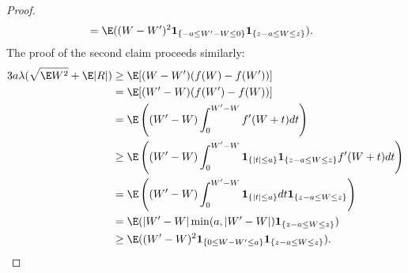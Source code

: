 \begin{proof}
\begin{align*}
    &= \E((W-W')^2 \mathbf{1}_{\{-a \leq W' - W \leq 0\}} \mathbf{1}_{\{z - a \leq W \leq z\}}).
  \end{align*}
  The proof of the second claim proceeds similarly:
    \begin{align*}
      3a \lambda (\sqrt{\E W^2} + \E |R|) &\geq \E [(W-W')(f(W)-f(W'))] \\
      &= \E [(W'-W)(f(W')-f(W))] \\
      &= \E \left ( (W'-W) \int_{0}^{W'-W} f'(W+t)dt \right ) \\ 
      &\geq \E \left( (W'-W) \int_{0}^{W'-W} \mathbf{1}_{\{|t| \leq a\}} 
      \mathbf{1}_{\{z - a \leq W \leq z\}} f'(W + t) dt \right ) \\
      &= \E \left( (W'-W) \int_{0}^{W'-W} \mathbf{1}_{\{|t| \leq a\}} dt
      \mathbf{1}_{\{z - a \leq W \leq z\}} \right ) \\
      &= \E(|W'-W| \min (a, |W'-W|) \mathbf{1}_{\{z - a \leq W \leq z\}}) \\
      &\geq \E((W'-W)^2 \mathbf{1}_{\{0 \leq W - W' \leq a\}} \mathbf{1}_{\{z - a \leq W \leq z\}}).
  \end{align*}
\end{proof}

